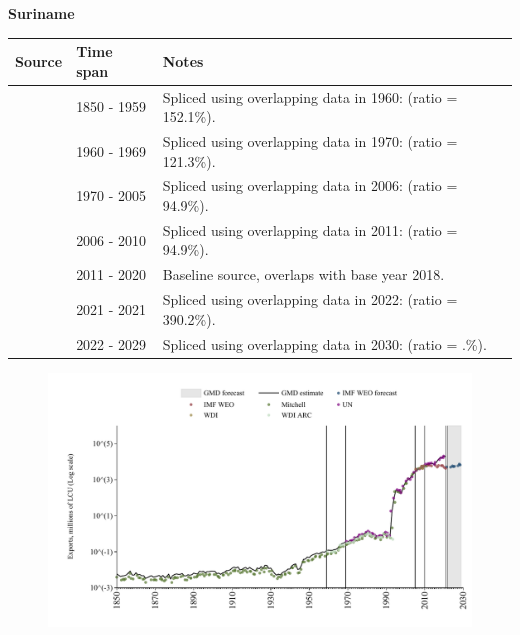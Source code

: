 \documentclass[12pt,a4paper,landscape]{article}
\begin{document}
\begin{adjustbox}{max totalsize={\paperwidth}{\paperheight},center}
\begin{minipage}[t][\textheight][t]{\textwidth}
\vspace*{0.5cm}
{}
\begin{center}
{\Large\bfseries Suriname}
\end{center}
\vspace{0.5cm}
\begin{table}[H]
\centering
\small
\begin{tabular}{|l|l|l|}
\hline
\textbf{Source} & \textbf{Time span} & \textbf{Notes} \\
\hline
\rowcolor{white}\cite{Mitchell}& 1850 - 1959 &Spliced using overlapping data in 1960: (ratio = 152.1\%).\\
\rowcolor{lightgray}\cite{WDI_ARC}& 1960 - 1969 &Spliced using overlapping data in 1970: (ratio = 121.3\%).\\
\rowcolor{white}\cite{UN}& 1970 - 2005 &Spliced using overlapping data in 2006: (ratio = 94.9\%).\\
\rowcolor{lightgray}\cite{WDI}& 2006 - 2010 &Spliced using overlapping data in 2011: (ratio = 94.9\%).\\
\rowcolor{white}\cite{UN}& 2011 - 2020 &Baseline source, overlaps with base year 2018.\\
\rowcolor{lightgray}\cite{IMF_WEO}& 2021 - 2021 &Spliced using overlapping data in 2022: (ratio = 390.2\%).\\
\rowcolor{white}\cite{IMF_WEO_forecast}& 2022 - 2029 &Spliced using overlapping data in 2030: (ratio = .\%).\\
\hline
\end{tabular}
\end{table}
\begin{figure}[H]
\centering
\includegraphics[width=\textwidth,height=0.6\textheight,keepaspectratio]{graphs/SUR_exports.pdf}
\end{figure}
\end{minipage}
\end{adjustbox}
\end{document}
